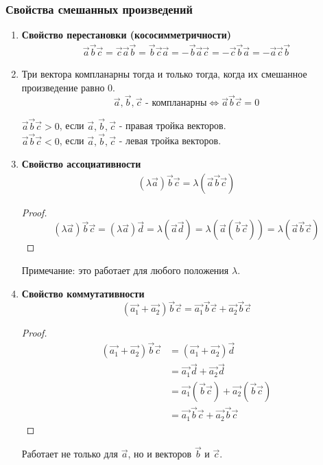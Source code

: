 \subsubsection{Свойства смешанных произведений}

\begin{enumerate}
  \item \textbf{Свойство перестановки (кососимметричности)} \\
    \begin{gather*}
      \vec{a} \vec{b} \vec{c} = \vec{c} \vec{a} \vec{b} = \vec{b} \vec{c} \vec{a} = -\vec{b} \vec{a} \vec{c} = - \vec{c} \vec{b} \vec{a} = - \vec{a} \vec{c} \vec{b}
    \end{gather*}

  \item Три вектора компланарны тогда и только тогда, когда их смешанное произведение равно 0. \[
  \vec{a}, \vec{b}, \vec{c} \text{ - компланарны} \iff \vec{a} \vec{b} \vec{c} = 0
  \] 
    \begin{note}
      $\vec{a} \vec{b} \vec{c} > 0$, если $\vec{a}, \vec{b}, \vec{c}$ - правая тройка векторов. \\
      $\vec{a} \vec{b} \vec{c} < 0$, если $\vec{a}, \vec{b}, \vec{c}$ - левая тройка векторов.
    \end{note}

  \item \textbf{Свойство ассоциативности} \\
    \begin{gather*}
      (\lambda \vec{a}) \vec{b} \vec{c} = \lambda (\vec{a} \vec{b} \vec{c})
    \end{gather*}
      \begin{proof}
        \[(\lambda \vec{a}) \vec{b} \vec{c} = (\lambda \vec{a}) \vec{d} = \lambda (\vec{a} \vec{d}) = \lambda (\vec{a} (\vec{b} \vec{c})) = \lambda (\vec{a} \vec{b} \vec{c})\]
      \end{proof}
      \begin{note}
        Примечание: это работает для любого положения $\lambda$.
      \end{note}

  \item \textbf{Свойство коммутативности} 
    \[
      (\vec{a_1} + \vec{a_2}) \vec{b} \vec{c} = \vec{a_1} \vec{b} \vec{c} + \vec{a_2} \vec{b} \vec{c}
    \] 
    \begin{proof}
      \begin{align*}
        (\vec{a_1} + \vec{a_2}) \vec{b} \vec{c} 
          &= (\vec{a_1} + \vec{a_2}) \vec{d}\\
          &= \vec{a_1} \vec{d} + \vec{a_2} \vec{d}\\
          &= \vec{a_1} (\vec{b} \vec{c}) + \vec{a_2} (\vec{b} \vec{c})\\
          &= \vec{a_1} \vec{b} \vec{c} + \vec{a_2} \vec{b} \vec{c}
      \end{align*}
    \end{proof}
    \begin{note}
      Работает не только для $\vec{a}$, но и векторов $\vec{b}$ и $\vec{c}$.
    \end{note}
\end{enumerate}

